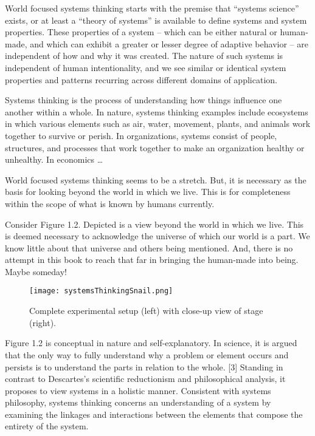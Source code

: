 World focused systems thinking starts with the premise that “systems science” exists, or at least a “theory of systems” is available to define systems and system properties. These properties of a system – which can be either natural or human-made, and which can exhibit a greater or lesser degree of adaptive behavior – are independent of how and why it was created. The nature of such systems is independent of human intentionality, and we see similar or identical system properties and patterns recurring across different domains of application.

Systems thinking is the process of understanding how things influence one another within a whole. In nature, systems thinking examples include ecosystems in which various elements such as air, water, movement, plants, and animals work together to survive or perish. In organizations, systems consist of people, structures, and processes that work together to make an organization healthy or unhealthy. In economics …

World focused systems thinking seems to be a stretch. But, it is necessary as the basis for looking beyond the world in which we live. This is for completeness within the scope of what is known by humans currently.

Consider Figure 1.2. Depicted is a view beyond the world in which we live. This is deemed necessary to acknowledge the universe of which our world is a part. We know little about that universe and others being mentioned. And, there is no attempt in this book to reach that far in bringing the human-made into being. Maybe someday!

\begin{figure}[h]
\centering
\texttt{[image: systemsThinkingSnail.png]}
\caption{Complete experimental setup (left) with close-up view of stage (right).}
\label{fig:systemsThinkingSnail}
\end{figure}

Figure 1.2 is conceptual in nature and self-explanatory. In science, it is argued that the only way to fully understand why a problem or element occurs and persists is to understand the parts in relation to the whole. [3] Standing in contrast to Descartes’s scientific reductionism and philosophical analysis, it proposes to view systems in a holistic manner. Consistent with systems philosophy, systems thinking concerns an understanding of a system by examining the linkages and interactions between the elements that compose the entirety of the system.

